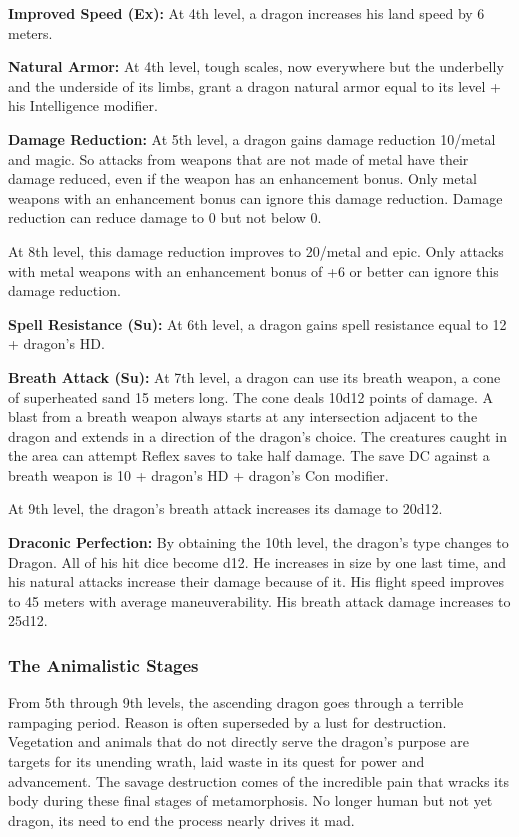 {\textbf{Improved Speed (Ex):} At 4th level, a dragon increases his land speed by 6 meters.

\textbf{Natural Armor:} At 4th level, tough scales, now everywhere but the underbelly and the underside of its limbs, grant a dragon natural armor equal to its level + his Intelligence modifier.

\textbf{Damage Reduction:} At 5th level, a dragon gains damage reduction 10/metal and magic. So attacks from weapons that are not made of metal have their damage reduced, even if the weapon has an enhancement bonus. Only metal weapons with an enhancement bonus can ignore this damage reduction. Damage reduction can reduce damage to 0 but not below 0.

At 8th level, this damage reduction improves to 20/metal and epic. Only attacks with metal weapons with an enhancement bonus of +6 or better can ignore this damage reduction.

\textbf{Spell Resistance (Su):} At 6th level, a dragon gains spell resistance equal to 12 + dragon's HD.

\textbf{Breath Attack (Su):} At 7th level, a dragon can use its breath weapon, a cone of superheated sand 15 meters long. The cone deals 10d12 points of damage. A blast from a breath weapon always starts at any intersection adjacent to the dragon and extends in a direction of the dragon's choice. The creatures caught in the area can attempt Reflex saves to take half damage. The save DC against a breath weapon is 10 + dragon's HD + dragon's Con modifier.

At 9th level, the dragon's breath attack increases its damage to 20d12.

\textbf{Draconic Perfection:} By obtaining the 10th level, the dragon's type changes to Dragon. All of his hit dice become d12. He increases in size by one last time, and his natural attacks increase their damage because of it. His flight speed improves to 45 meters with average maneuverability. His breath attack damage increases to 25d12.

\subsubsection{The Animalistic Stages}
From 5th through 9th levels, the ascending dragon goes through a terrible rampaging period. Reason is often superseded by a lust for destruction. Vegetation and animals that do not directly serve the dragon's purpose are targets for its unending wrath, laid waste in its quest for power and advancement. The savage destruction comes of the incredible pain that wracks its body during these final stages of metamorphosis. No longer human but not yet dragon, its need to end the process nearly drives it mad.

}
